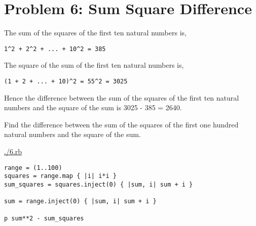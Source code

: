 \documentclass[11pt]{article}
\begin{document}
\section{Problem 6: Sum Square Difference}
\label{sec-6}

The sum of the squares of the first ten natural numbers is,

\begin{verbatim}
1^2 + 2^2 + ... + 10^2 = 385
\end{verbatim}

The square of the sum of the first ten natural numbers is,

\begin{verbatim}
(1 + 2 + ... + 10)^2 = 55^2 = 3025
\end{verbatim}

Hence the difference between the sum of the squares of the first ten natural 
numbers and the square of the sum is 3025 - 385 = 2640.

Find the difference between the sum of the squares of the first one hundred 
natural numbers and the square of the sum.

\url{./6.rb}

\begin{verbatim}
range = (1..100)
squares = range.map { |i| i*i }
sum_squares = squares.inject(0) { |sum, i| sum + i }

sum = range.inject(0) { |sum, i| sum + i }

p sum**2 - sum_squares
\end{verbatim}
\end{document}
